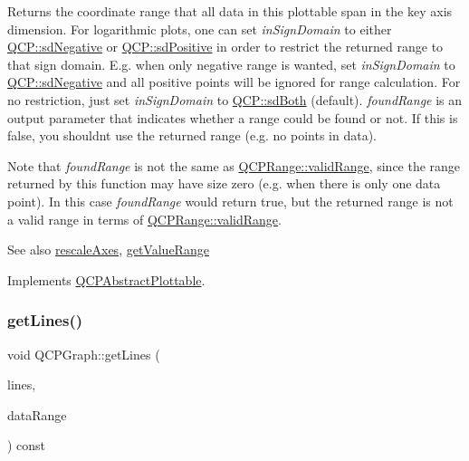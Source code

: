 Returns the coordinate range that all data in this plottable span in the key axis dimension. For logarithmic plots, one can set {\itshape in\+Sign\+Domain} to either \hyperlink{namespace_q_c_p_afd50e7cf431af385614987d8553ff8a9a2d18af0bc58f6528d1e82ce699fe4829}{Q\+C\+P\+::sd\+Negative} or \hyperlink{namespace_q_c_p_afd50e7cf431af385614987d8553ff8a9a584784b75fb816abcc627cf743bb699f}{Q\+C\+P\+::sd\+Positive} in order to restrict the returned range to that sign domain. E.\+g. when only negative range is wanted, set {\itshape in\+Sign\+Domain} to \hyperlink{namespace_q_c_p_afd50e7cf431af385614987d8553ff8a9a2d18af0bc58f6528d1e82ce699fe4829}{Q\+C\+P\+::sd\+Negative} and all positive points will be ignored for range calculation. For no restriction, just set {\itshape in\+Sign\+Domain} to \hyperlink{namespace_q_c_p_afd50e7cf431af385614987d8553ff8a9aa38352ef02d51ddfa4399d9551566e24}{Q\+C\+P\+::sd\+Both} (default). {\itshape found\+Range} is an output parameter that indicates whether a range could be found or not. If this is false, you shouldn\textquotesingle{}t use the returned range (e.\+g. no points in data).

Note that {\itshape found\+Range} is not the same as \hyperlink{class_q_c_p_range_ab38bd4841c77c7bb86c9eea0f142dcc0}{Q\+C\+P\+Range\+::valid\+Range}, since the range returned by this function may have size zero (e.\+g. when there is only one data point). In this case {\itshape found\+Range} would return true, but the returned range is not a valid range in terms of \hyperlink{class_q_c_p_range_ab38bd4841c77c7bb86c9eea0f142dcc0}{Q\+C\+P\+Range\+::valid\+Range}.

\begin{DoxySeeAlso}{See also}
\hyperlink{class_q_c_p_abstract_plottable_a1491c4a606bccd2d09e65e11b79eb882}{rescale\+Axes}, \hyperlink{class_q_c_p_graph_a8f773e56f191a61c06e129e90a604d77}{get\+Value\+Range} 
\end{DoxySeeAlso}


Implements \hyperlink{class_q_c_p_abstract_plottable_a4da16d3cd4b509e1104a9b0275623c96}{Q\+C\+P\+Abstract\+Plottable}.

\mbox{\label{class_q_c_p_graph_a563c6da2126300a4d9d2bdee30dad040}} 
\subsubsection{\texorpdfstring{get\+Lines()}{getLines()}}
{\footnotesize\ttfamily void Q\+C\+P\+Graph\+::get\+Lines (\begin{DoxyParamCaption}\item[{Q\+Vector$<$ Q\+PointF $>$ $\ast$}]{lines,  }\item[{const \hyperlink{class_q_c_p_data_range}{Q\+C\+P\+Data\+Range} \&}]{data\+Range }\end{DoxyParamCaption}) const\hspace{0.3cm}{\ttfamily [protected]}}

